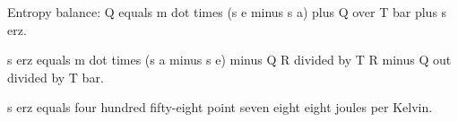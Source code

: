 Entropy balance:  
Q equals m dot times (s e minus s a) plus Q over T bar plus s erz.  

s erz equals m dot times (s a minus s e) minus Q R divided by T R minus Q out divided by T bar.  

s erz equals four hundred fifty-eight point seven eight eight joules per Kelvin.